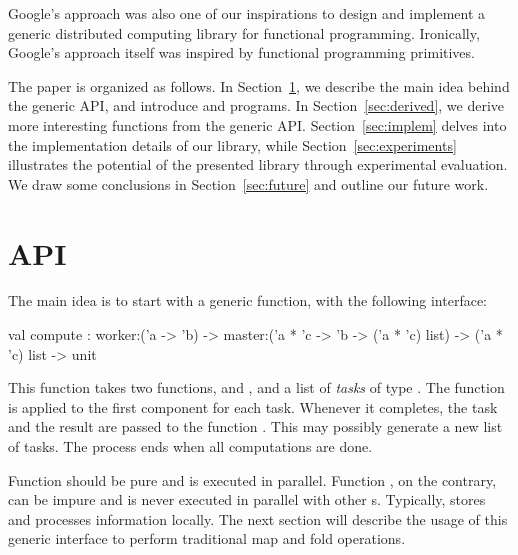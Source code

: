 \documentclass[preprint]{sigplanconf}
\begin{document}
Google's approach was also one of our inspirations to design and
implement a generic distributed computing library for functional
programming. Ironically, Google's approach itself was inspired by
functional programming primitives.

The paper is organized as follows. In Section~\ref{sec:API}, we
describe the main idea behind the generic API, and introduce
 and  programs. In Section~\ref{sec:derived}, we
derive more interesting functions from the generic
API. Section~\ref{sec:implem} delves into the implementation details
of our library, while Section~\ref{sec:experiments} illustrates the
potential of the presented library through experimental evaluation. We
draw some conclusions in Section~\ref{sec:future} and outline our
future work.


\section{API}\label{sec:API}

The main idea is to start with a generic function, with the
following interface: 
\begin{ocaml}
  val compute : 
    worker:('a -> 'b) -> 
    master:('a * 'c -> 'b -> ('a * 'c) list) -> 
    ('a * 'c) list -> unit
\end{ocaml}
This function takes two functions,  and , and a
list of \emph{tasks} of type .
The function  is applied to the first component for each task.
Whenever it completes, the task and the result are passed to the
function . This may possibly generate a new list of
tasks. The process ends when all computations are done.

Function  should be pure and is executed in parallel.
Function , on the contrary, can be impure and is never
executed in parallel with other s. Typically,
 stores and processes information locally.
The next section will describe the usage of this generic interface to
perform traditional map and fold operations.
\end{document}
